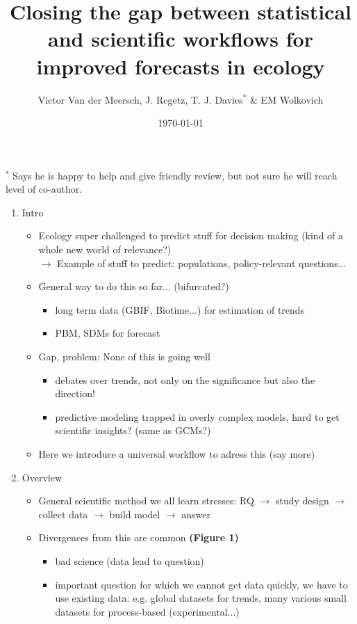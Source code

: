 \documentclass[11pt]{article}
\begin{document}
\renewcommand{\refname}{\CHead{}}

\title{Closing the gap between statistical and scientific workflows for improved forecasts in ecology } 
\date{\today}
\author{Victor Van der Meersch, J. Regetz, T. J. Davies$^*$ \& EM Wolkovich}
\maketitle
$^*$ Says he is happy to help and give friendly review, but not sure he will reach level of co-author. 

\begin{enumerate}
\item Intro
\begin{itemize}
\item Ecology super challenged to predict stuff for decision making (kind of a whole new world of relevance?)\\
$\rightarrow$ Example of stuff to predict: populations, policy-relevant questions...
\item General way to do this so far... (bifurcated?)
\begin{itemize}
\item long term data (GBIF, Biotime...) for estimation of trends
\item PBM, SDMs for forecast
\end{itemize}
\item Gap, problem: None of this is going well
\begin{itemize}
\item debates over trends, not only on the significance but also the direction!
\item predictive modeling trapped in overly complex models, hard to get scientific insights? (same as GCMs?)
\end{itemize}
\item Here we introduce a universal workflow to adress this (say more)
\end{itemize}
\item Overview
\begin{itemize}
\item General scientific method we all learn stresses: RQ $\rightarrow$ study design $\rightarrow$ collect data $\rightarrow$ build model $\rightarrow$ answer
\item Divergences from this are common \textbf{(Figure 1)}
\begin{itemize}
\item bad science (data lead to question)
\item important question for which we cannot get data quickly, we have to use existing data: e.g. global datasets for trends, many various small datasets for process-based (experimental...)

\end{itemize}
\end{itemize}
\end{enumerate}
\end{document}
